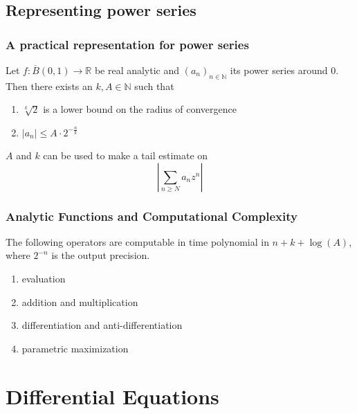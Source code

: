 \documentclass[xcolor=pdftex,dvipsnames,table]{beamer}
\newcommand{\N}{\ensuremath{\mathbb{N}}}
\newcommand{\R}{\ensuremath{\mathbb{R}}}
\newcommand{\abs}[1]{\left|#1\right|}
\begin{document}
\subsection{Representing power series}
\begin{frame}
\frametitle{A practical representation for power series}
\begin{lemma}
  Let $f : \overline B(0,1) \to \R$ be real analytic and $(a_n)_{n \in \N}$ its power series around $0$.\\
  Then there exists an $k,A \in \N$ such that 
  \begin{enumerate}
  \item $\sqrt[k]{2}$ is a lower bound on the radius of convergence
  \item $\abs{a_n} \leq A \cdot 2^{-\frac{n}{k}}$
  \end{enumerate}
\end{lemma}
\pause
$A$ and $k$ can be used to make a tail estimate on
$$ \left | \sum_{n \geq N} a_n z^n \right |  $$
\end{frame}
\begin{frame}
\frametitle{Analytic Functions and Computational Complexity}
\begin{theorem}
  The following operators are computable in time polynomial in $n+k+\log(A)$, where $2^{-n}$ is the output precision.
\begin{enumerate}
\item evaluation
\item addition and multiplication
\item differentiation and anti-differentiation
\item parametric maximization
\end{enumerate}
\end{theorem}
\end{frame}
\section{Differential Equations}
\end{document}
